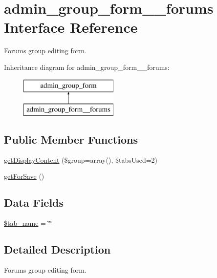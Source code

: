 \hypertarget{classadmin__group__form____forums}{\section{admin\-\_\-group\-\_\-form\-\_\-\-\_\-forums Interface Reference}
\label{classadmin__group__form____forums}
}


Forums group editing form.  


Inheritance diagram for admin\-\_\-group\-\_\-form\-\_\-\-\_\-forums\-:\begin{figure}[H]
\begin{center}
\leavevmode
\includegraphics[height=2.000000cm]{classadmin__group__form____forums}
\end{center}
\end{figure}
\subsection*{Public Member Functions}
\begin{DoxyCompactItemize}
\item 
\hyperlink{classadmin__group__form____forums_a083de15a97f5e0a0ef60de656f8da320}{get\-Display\-Content} (\$group=array(), \$tabs\-Used=2)
\item 
\hyperlink{classadmin__group__form____forums_aa584200e117d7f02d4fabc05b109e51f}{get\-For\-Save} ()
\end{DoxyCompactItemize}
\subsection*{Data Fields}
\begin{DoxyCompactItemize}
\item 
\hyperlink{classadmin__group__form____forums_a924f0502d852ff2259cef00e4fa12d94}{\$tab\-\_\-name} = \char`\"{}\char`\"{}
\end{DoxyCompactItemize}


\subsection{Detailed Description}
Forums group editing form. 

